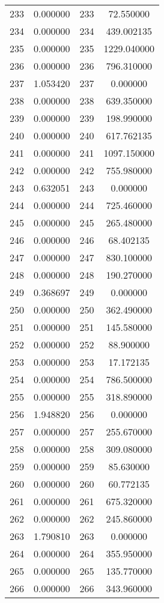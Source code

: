 \documentclass[12pt]{article}
\begin{document}
\begin{longtable}{@{}cccc@{}}
233 & 0.000000 & 233 & 72.550000 \\
234 & 0.000000 & 234 & 439.002135 \\
235 & 0.000000 & 235 & 1229.040000 \\
236 & 0.000000 & 236 & 796.310000 \\
237 & 1.053420 & 237 & 0.000000 \\
238 & 0.000000 & 238 & 639.350000 \\
239 & 0.000000 & 239 & 198.990000 \\
240 & 0.000000 & 240 & 617.762135 \\
241 & 0.000000 & 241 & 1097.150000 \\
242 & 0.000000 & 242 & 755.980000 \\
243 & 0.632051 & 243 & 0.000000 \\
244 & 0.000000 & 244 & 725.460000 \\
245 & 0.000000 & 245 & 265.480000 \\
246 & 0.000000 & 246 & 68.402135 \\
247 & 0.000000 & 247 & 830.100000 \\
248 & 0.000000 & 248 & 190.270000 \\
249 & 0.368697 & 249 & 0.000000 \\
250 & 0.000000 & 250 & 362.490000 \\
251 & 0.000000 & 251 & 145.580000 \\
252 & 0.000000 & 252 & 88.900000 \\
253 & 0.000000 & 253 & 17.172135 \\
254 & 0.000000 & 254 & 786.500000 \\
255 & 0.000000 & 255 & 318.890000 \\
256 & 1.948820 & 256 & 0.000000 \\
257 & 0.000000 & 257 & 255.670000 \\
258 & 0.000000 & 258 & 309.080000 \\
259 & 0.000000 & 259 & 85.630000 \\
260 & 0.000000 & 260 & 60.772135 \\
261 & 0.000000 & 261 & 675.320000 \\
262 & 0.000000 & 262 & 245.860000 \\
263 & 1.790810 & 263 & 0.000000 \\
264 & 0.000000 & 264 & 355.950000 \\
265 & 0.000000 & 265 & 135.770000 \\
266 & 0.000000 & 266 & 343.960000 \\

\end{longtable}
\end{document}
